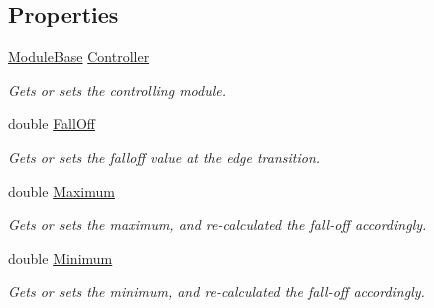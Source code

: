 \subsection*{Properties}
\begin{DoxyCompactItemize}
\item 
\hyperlink{class_lib_noise_1_1_module_base}{Module\+Base} \hyperlink{class_lib_noise_1_1_operator_1_1_select_a302be03766a4c564588078b0cbde4445}{Controller}
\begin{DoxyCompactList}\small\item\em Gets or sets the controlling module. \end{DoxyCompactList}\item 
double \hyperlink{class_lib_noise_1_1_operator_1_1_select_a03f1c9cfacabc7b43efef9f4beefc8b0}{Fall\+Off}
\begin{DoxyCompactList}\small\item\em Gets or sets the falloff value at the edge transition. \end{DoxyCompactList}\item 
double \hyperlink{class_lib_noise_1_1_operator_1_1_select_ac3d0dd2ba9be417b85e2d0c1c0dcb57e}{Maximum}
\begin{DoxyCompactList}\small\item\em Gets or sets the maximum, and re-\/calculated the fall-\/off accordingly. \end{DoxyCompactList}\item 
double \hyperlink{class_lib_noise_1_1_operator_1_1_select_aefa3d148847562fba2ccda301d5e983d}{Minimum}
\begin{DoxyCompactList}\small\item\em Gets or sets the minimum, and re-\/calculated the fall-\/off accordingly. \end{DoxyCompactList}\end{DoxyCompactItemize}
